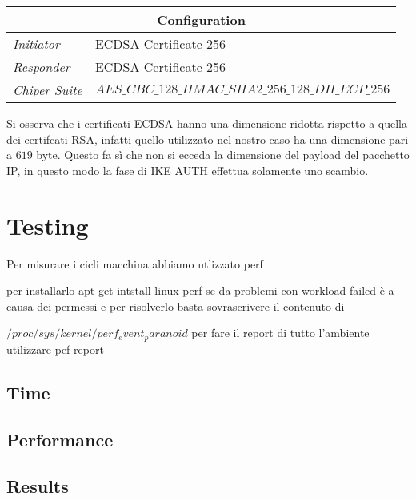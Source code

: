 \documentclass[
10pt, %
a4paper, %
oneside, %
headinclude,footinclude, %
BCOR5mm, %
]{scrartcl}
\begin{document}
\begin{center}
    \setlength{\arrayrulewidth}{0.4mm}
    \renewcommand{\arraystretch}{1.3}
    \begin{tabular}{|l|l|}
        \hline
        \multicolumn{2}{|c|}{\textbf{Configuration}} \\
        \hline
        \textit{Initiator} & ECDSA Certificate 256\\
        \textit{Responder} & ECDSA Certificate 256 \\
        \textit{Chiper Suite} & $AES\_CBC\_128\_HMAC\_SHA2\_256\_128\_DH\_ECP\_256$ \\
        \hline
    \end{tabular}
\end{center}
\vspace*{0.2cm}
\noindent
Si osserva che i certificati ECDSA hanno una dimensione ridotta rispetto a quella dei certifcati RSA, infatti quello utilizzato nel
nostro caso ha una dimensione pari a $619$ byte. Questo fa sì che non si ecceda la dimensione del payload del pacchetto IP, in questo
modo la fase di IKE AUTH effettua solamente uno scambio.


\newpage
\section{Testing}

Per misurare i cicli macchina abbiamo utlizzato perf 

per installarlo apt-get intstall linux-perf se da problemi con workload failed è a causa dei permessi e per risolverlo basta sovrascrivere il contenuto di


$/proc/sys/kernel/perf_event_paranoid$
per fare il report di tutto l'ambiente utilizzare pef report
\subsection{Time}

\subsection{Performance}

\subsection{Results}
\end{document}
